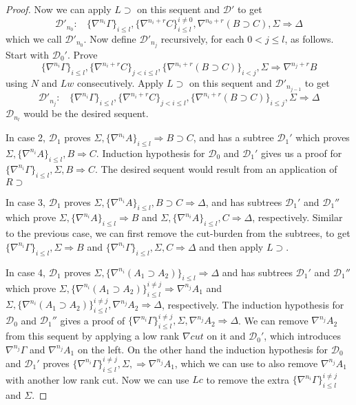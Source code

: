 \begin{proof}
  Now we can apply $L \supset$ on this sequent and $\mathcal{D}'$ to get
  $$\mathcal{D}'_{n_0}:~~~~\{\nabla^{n_i} \Gamma\}_{i \leq l}, \{\nabla^{n_i+r}C\}_{i \leq l}^{i \neq 0}, \nabla^{n_0+r} (B \supset C), \Sigma \Rightarrow \Delta$$
  which we call $\mathcal{D}'_{n_0}$. Now define $\mathcal{D}'_{n_j}$ recursively, for each $0 < j \leq l$, as follows. Start with $\mathcal{D}_0'$. Prove
  $$\{\nabla^{n_i} \Gamma\}_{i \leq l}, \{\nabla^{n_i+r}C\}_{j < i \leq l}, \{ \nabla^{n_i+r} (B \supset C) \}_{i < j}, \Sigma \Rightarrow \nabla^{n_j+r} B$$
  using $N$ and $Lw$ consecutively. Apply $L \supset$ on this sequent and $\mathcal{D}'_{n_{j-1}}$ to get
  $$\mathcal{D}'_{n_j}:~~~~\{\nabla^{n_i} \Gamma\}_{i \leq l}, \{\nabla^{n_i+r}C\}_{j < i \leq l}, \{ \nabla^{n_i+r} (B \supset C) \}_{i \leq j}, \Sigma \Rightarrow \Delta$$
  $\mathcal{D}_{n_l}$ would be the desired sequent.

  In case 2, $\mathcal{D}_1$ proves $\Sigma, \{ \nabla^{n_i} A \}_{i \leq l} \Rightarrow B \supset C$, and has a subtree $\mathcal{D}_1'$ which proves $\Sigma, \{ \nabla^{n_i} A \}_{i \leq l}, B \Rightarrow C$. Induction hypothesis for $\mathcal{D}_0$ and $\mathcal{D}_1'$ gives us a proof for $\{ \nabla^{n_i} \Gamma \}_{i \leq l}, \Sigma, B \Rightarrow C$. The desired sequent would result from an application of $R \supset$

  In case 3, $\mathcal{D}_1$ proves $\Sigma, \{ \nabla^{n_i} A \}_{i \leq l}, B \supset C \Rightarrow \Delta$, and has subtrees $\mathcal{D}_1'$ and $\mathcal{D}_1''$ which prove $\Sigma, \{ \nabla^{n_i} A \}_{i \leq l} \Rightarrow B$ and $\Sigma, \{ \nabla^{n_i} A \}_{i \leq l}, C \Rightarrow \Delta$, respectively. Similar to the previous case, we can first remove the cut-burden from the subtrees, to get $\{ \nabla^{n_i} \Gamma \}_{i \leq l}, \Sigma \Rightarrow B$ and $\{ \nabla^{n_i} \Gamma \}_{i \leq l}, \Sigma, C \Rightarrow \Delta$ and then apply $L \supset$.

  In case 4, $\mathcal{D}_1$ proves $\Sigma,  \{\nabla^{n_i} (A_1 \supset A_2)\}_{i \leq l} \Rightarrow \Delta$ and has subtrees $\mathcal{D}_1'$ and $\mathcal{D}_1''$ which prove $\Sigma, \{\nabla^{n_i} (A_1 \supset A_2)\}_{i \leq l}^{i \neq j} \Rightarrow \nabla^{n_j} A_1$ and $\Sigma, \{\nabla^{n_i} (A_1 \supset A_2)\}_{i \leq l}^{i \neq j}, \nabla^{n_j} A_2 \Rightarrow \Delta$, respectively. The induction hypothesis for $\mathcal{D}_0$ and $\mathcal{D}_1''$ gives a proof of $\{\nabla^{n_i} \Gamma\}_{i \leq l}^{i \neq j}, \Sigma, \nabla^{n_j} A_2 \Rightarrow \Delta$. We can remove $\nabla^{n_j} A_2$ from this sequent by applying a low rank $\nabla cut$ on it and $\mathcal{D}_0'$, which introduces $\nabla^{n_j} \Gamma$ and $\nabla^{n_j} A_1$ on the left. On the other hand the induction hypothesis for $\mathcal{D}_0$ and $\mathcal{D}_1'$ proves $\{\nabla^{n_i} \Gamma\}_{i \leq l}^{i \neq j}, \Sigma, \Rightarrow \nabla^{n_j} A_1$, which we can use to also remove $\nabla^{n_j} A_1$ with another low rank cut. Now we can use $Lc$ to remove the extra $\{\nabla^{n_i} \Gamma\}_{i \leq l}^{i \neq j}$ and $\Sigma$.
 
\end{proof}